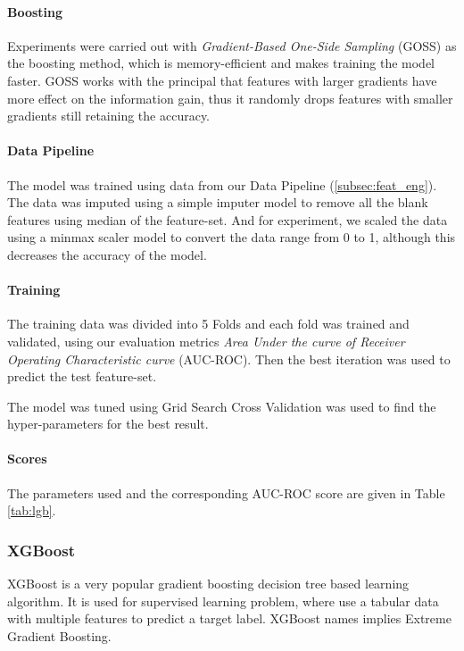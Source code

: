 \documentclass[sigconf, nonacm]{acmart}
\begin{document}
\paragraph{Boosting}
Experiments were carried out with \emph{Gradient-Based One-Side Sampling} (GOSS) as the boosting method, which is memory-efficient and makes training the model faster. GOSS works with the principal that features with larger gradients have more effect on the information gain, thus it randomly drops features with smaller gradients still retaining the accuracy.

\paragraph{Data Pipeline}
The model was trained using data from our Data Pipeline (\ref{subsec:feat_eng}). The data was imputed using a simple imputer model\cite{sklearn.impute.simpleimputer} to remove all the blank features using median of the feature-set. And for experiment, we scaled the data using a minmax scaler\cite{sklearn.preprocessing.minmaxscaler} model to convert the data range from 0 to 1, although this decreases the accuracy of the model.

\paragraph{Training}
The training data was divided into 5 Folds and each fold was trained and validated, using our evaluation metrics \emph{Area Under the curve of Receiver Operating Characteristic curve} (AUC-ROC). Then the best iteration was used to predict the test feature-set. \label{kfold}

The model \cite{parameters_tuning_lightgbm} was tuned using Grid Search Cross Validation\cite{sklearn.model_selection.gridsearchcv} was used to find the hyper-parameters\cite{parameters_lightgbm} for the best result.

\paragraph{Scores}
The parameters used and the corresponding AUC-ROC score are given in Table \ref{tab:lgb}.

\subsubsection{XGBoost} \label{subsubsec:xgb}

XGBoost\cite{Chen_2016} is a very popular gradient boosting decision tree\cite{friedman2001greedy} based learning algorithm. It is used for supervised learning problem, where use a tabular data with multiple features to predict a target label. XGBoost names implies Extreme Gradient Boosting.
\end{document}
